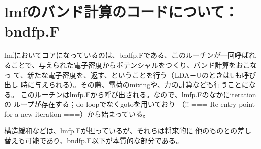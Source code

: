 \documentclass[a4paper,10pt,aip,onecolumn,amsmath,amssymb,floatfix,rmp]{revtex4-1}
\begin{document}
\section{lmfのバンド計算のコードについて：bndfp.F}
lmfにおいてコアになっているのは、bndfp.Fである、このルーチンが一回呼ばれ
ることで、与えられた電子密度からポテンシャルをつくり、バンド計算をおこなっ
て、新たな電子密度を、返す、ということを行う（LDA＋UのときはUも呼び出し
時に与えられる）。その際、電荷のmixingや、力の計算なども行うことになる。
このルーチンはlmfp.Fから呼び出される。なので、lmfp.Fのなかにiterationの
ループが存在する；do loopでなくgotoを用いており
（!! === Re-entry point for a new iteration ===）から始まっている。

構造緩和などは、lmfp.Fが担っているが、それらは将来的に
他のものとの差し替えも可能であり、bndfp.F以下が本質的な部分である。




\end{document}
